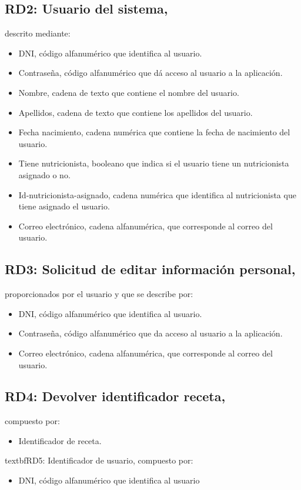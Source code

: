 \documentclass[12pt,letterpaper]{article}
\begin{document}
\subsection{RD2: Usuario del sistema,} descrito mediante:
\begin{itemize}
\item DNI, código alfanumérico que identifica al usuario.
\item Contraseña, código alfanumérico que dá acceso al usuario a la aplicación.
\item Nombre, cadena de texto que contiene el nombre del usuario. 
\item Apellidos, cadena de texto que contiene los apellidos del usuario.
\item Fecha nacimiento, cadena numérica que contiene la fecha de nacimiento del usuario.
\item Tiene nutricionista, booleano que indica si el usuario tiene un nutricionista asignado o no.
\item Id-nutricionista-asignado, cadena numérica que identifica al nutricionista que tiene asignado el usuario.
\item Correo electrónico, cadena alfanumérica, que corresponde al correo del usuario.

\end{itemize} 
\subsection{RD3: Solicitud de editar información personal,} proporcionados por el usuario y que se describe por:
\begin{itemize}
\item DNI, código alfanumérico que identifica al usuario.
\item Contraseña, código alfanumérico que da acceso al usuario a la aplicación.
\item Correo electrónico, cadena alfanumérica, que corresponde al correo del usuario. 

\end{itemize} 
\subsection{RD4: Devolver identificador receta,} compuesto por:
\begin{itemize}
\item Identificador de receta.

\end{itemize} 
textbf{RD5: Identificador de usuario,} compuesto por:
\begin{itemize}
\item DNI, código alfanumérico que identifica al usuario

\end{itemize} 
\end{document}
